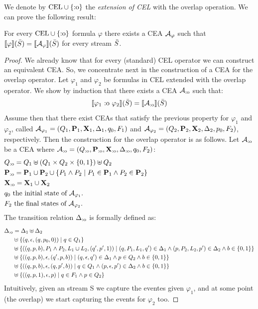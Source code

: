 We denote by $\text{CEL} \cup \{\text{:o}\}$ the \emph{extension of CEL} with the overlap operation. We can prove the following result:

\begin{theorem} \label{theo:overlap}
	For every $\text{CEL} \cup \{\text{:o}\}$ formula $\varphi$ there exists a CEA $\mathcal{A}_\varphi$ such that $\sem{\varphi}(\Stream) = \sem{\cA_\varphi}(\Stream)$ for every stream $\bar{S}$.
\end{theorem}

\begin{proof}
	We already know that for every (standard) CEL operator we can construct an equivalent CEA. So, we concentrate next in the construction of a CEA for the overlap operator. 
	Let $\varphi_1$ and $\varphi_2$ be formulas in CEL extended with the overlap operator. We show by induction that there exists a CEA $\mathcal{A}_{\text{:o}}$ such that:
	\[
	\sem{\varphi_1 \overlap \varphi_2}(\Stream) = \sem{\cAoverlap}(\Stream)
	\]
	Assume then that there exist CEAs that satisfy the previous property for $\varphi_1$ and $\varphi_2$, called $\mathcal{A}_{\varphi_1} = (Q_1, \mathbf{P}_1, \mathbf{X}_1, \Delta_1, q_0, F_1)$ and $\mathcal{A}_{\varphi_2} = (Q_2, \mathbf{P}_2, \mathbf{X}_2, \Delta_2, p_0, F_2)$, respectively. 
	Then the construction for the overlap operator is as follows.
	Let $\mathcal{A}_{\text{:o}}$ be a CEA where $\mathcal{A}_{\text{:o}} = (Q_{\text{:o}}, \mathbf{P}_{\text{:o}}, \mathbf{X}_{\text{:o}}, \Delta_{\text{:o}}, q_0, F_2)$:
	\[
	\begin{aligned}[t]
		& \Qoverlap = Q_1 \uplus (Q_1 \times Q_2 \times \{0, 1\}) \uplus Q_2 \\
		& \Poverlap = \SETP_1 \cup \SETP_2 \cup \{ P_1 \land P_2 \mid P_1 \in \SETP_1 \land P_2 \in \SETP_2 \} \hspace*{155px}\\
		& \Xoverlap  = \SETX_1 \cup \SETX_2 \\
		& q_0 \text{ the initial state of }\cA_{\varphi_1}.\\
		& F_2 \text{ the final states of } \cA_{\varphi_2}.
	\end{aligned}
	\]
	The transition relation $\Delta_{\text{:o}}$ is formally defined as:
	\[
	\begin{aligned}[t]
		\Delta_{\text{:o}} & = \Delta_1 \uplus \Delta_2 \\
		& \uplus \{(q, \epsilon, (q, p_0, 0)) \mid q \in Q_1\} \\
		& \uplus \{((q, p, b), P_1 \land P_2, L_1 \cup L_2, (q', p', 1)) \mid (q, P_1, L_1, q') \in \Delta_1 \land (p, P_2, L_2, p') \in \Delta_2 \land b \in \{0, 1\}\} \\
		& \uplus \{((q, p, b), \epsilon, (q', p, b)) \mid (q, \epsilon, q') \in \Delta_1 \land p \in Q_2 \land b \in \{0, 1\}\}  \\
		& \uplus \{((q, p, b), \epsilon, (q, p', b)) \mid q \in Q_1 \land (p, \epsilon, p') \in \Delta_2 \land b \in \{0, 1\}\}  \\
		& \uplus \{((q, p, 1), \epsilon, p) \mid q \in F_1 \land p \in Q_2\}
	\end{aligned}
	\]
Intuitively, given an stream S we capture the eventes given $\varphi_1$, and at some point (the overlap) we start capturing the events for $\varphi_2$ too.


\end{proof}
